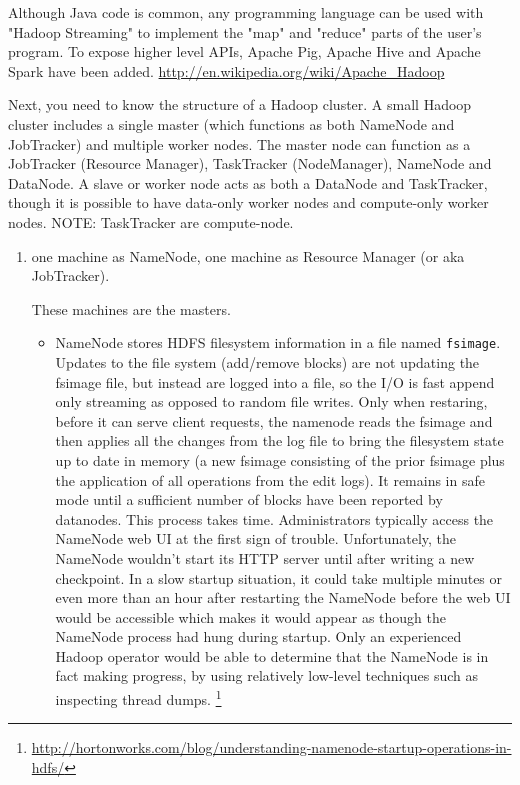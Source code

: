 Although Java code is common, any programming language can be used with "Hadoop
Streaming" to implement the "map" and "reduce" parts of the user's program. To
expose higher level APIs, Apache Pig, Apache Hive and Apache Spark have been
added. 
\url{http://en.wikipedia.org/wiki/Apache_Hadoop}

Next, you need to know the structure of a Hadoop cluster. 
A small Hadoop cluster includes a single master (which functions as both
NameNode and JobTracker) and multiple worker nodes.
The master node can function as a JobTracker (Resource Manager), TaskTracker
(NodeManager), NameNode and DataNode.
A slave or worker node acts as both a DataNode and TaskTracker, though it is
possible to have data-only worker nodes and compute-only worker nodes. NOTE:
TaskTracker are compute-node.

\begin{enumerate}
  \item one machine as NameNode, one machine as Resource Manager (or aka
  JobTracker).
    
  These machines are the masters.
  \begin{itemize}
    \item NameNode stores HDFS filesystem information in a file named
    \verb!fsimage!. Updates to the file system (add/remove blocks) are not
    updating the fsimage file, but instead are logged into a file, so the I/O
    is fast append only streaming as opposed to random file writes. Only when
    restaring, before it can serve client requests, the namenode reads the
    fsimage and then applies all the changes from the log file to bring the filesystem state up to date in
    memory (a new fsimage consisting of the prior fsimage plus the application
    of all operations from the edit logs). It remains in safe mode until a
    sufficient number of blocks have been reported by datanodes. This process
    takes time. Administrators typically access the NameNode web UI at the first
    sign of trouble.  Unfortunately, the NameNode wouldn't start its HTTP server
    until after writing a new checkpoint.  In a slow startup situation, it could
    take multiple minutes or even more than an hour after restarting the
    NameNode before the web UI would be accessible which makes it would appear
    as though the NameNode process had hung during startup.
    Only an experienced Hadoop operator would be able to determine that the
    NameNode is in fact making progress, by using relatively low-level
    techniques such as inspecting thread dumps.
    \footnote{\url{http://hortonworks.com/blog/understanding-namenode-startup-operations-in-hdfs/}}
    

\end{itemize}
\end{enumerate}
